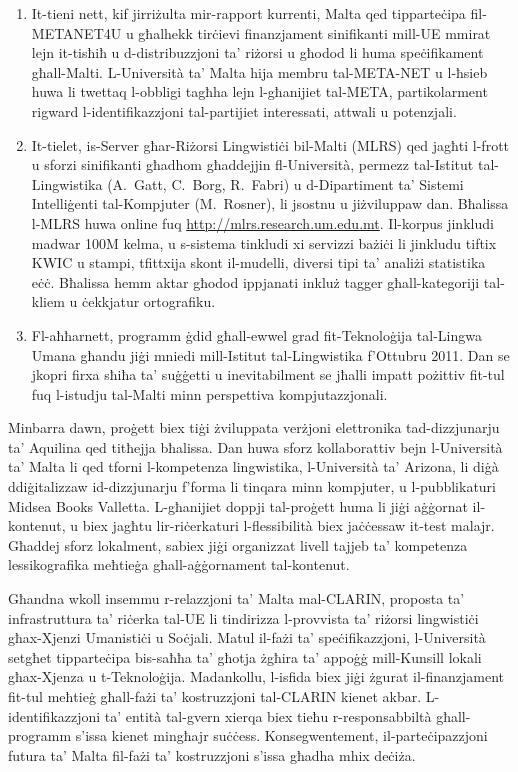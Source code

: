 \begin{multicols}{2}
\begin{enumerate}
\item It-tieni nett, kif jirriżulta mir-rapport kurrenti, Malta qed tipparteċipa fil-METANET4U u għalhekk tirċievi finanzjament sinifikanti mill-UE mmirat lejn it-tisħiħ u d-distribuzzjoni ta’ riżorsi u għodod li huma speċifikament għall-Malti. L-Università ta’ Malta hija membru tal-META-NET u l-ħsieb huwa li twettaq l-obbligi tagħha lejn l-għanijiet tal-META, partikolarment rigward l-identifikazzjoni tal-partijiet interessati, attwali u potenzjali. 

\item It-tielet, is-Server għar-Riżorsi Lingwistiċi bil-Malti (MLRS) \cite{Rosner-et-al:2006, MLRS1} qed jagħti l-frott u sforzi sinifikanti għadhom għaddejjin fl-Università, permezz tal-Istitut tal-Lingwistika (A.~Gatt, C.~Borg, R.~Fabri) u d-Dipartiment ta’ Sistemi Intelliġenti tal-Kompjuter (M.~Rosner), li jsostnu u jiżviluppaw dan. Bħalissa l-MLRS huwa online fuq \url{http://mlrs.research.um.edu.mt}. Il-korpus jinkludi madwar 100M kelma, u s-sistema tinkludi xi servizzi bażiċi li jinkludu tiftix KWIC u stampi, tfittxija skont il-mudelli, diversi tipi ta’ analiżi statistika eċċ. Bħalissa hemm aktar għodod ippjanati inkluż tagger għall-kategoriji tal-kliem u ċekkjatur ortografiku.

\item Fl-aħħarnett, programm ġdid għall-ewwel grad fit-Teknoloġija tal-Lingwa Umana għandu jiġi mniedi mill-Istitut tal-Lingwistika f’Ottubru 2011. Dan se jkopri firxa sħiħa ta’ suġġetti u inevitabilment se jħalli impatt pożittiv fit-tul fuq l-istudju tal-Malti minn perspettiva kompjutazzjonali.
\end{enumerate}

Minbarra dawn, proġett biex tiġi żviluppata verżjoni elettronika tad-dizzjunarju ta’ Aquilina \cite{Aquilina:1987,Aquilina:1990} qed titħejja bħalissa. Dan huwa sforz kollaborattiv bejn l-Università ta’ Malta li qed tforni l-kompetenza lingwistika, l-Università ta’ Arizona, li diġà ddiġitalizzaw id-dizzjunarju f’forma li tinqara minn kompjuter, u l-pubblikaturi Midsea Books Valletta. L-għanijiet doppji tal-proġett huma li jiġi aġġornat il-kontenut, u biex jagħtu lir-riċerkaturi l-flessibilità biex jaċċessaw it-test malajr. Għaddej sforz lokalment, sabiex jiġi organizzat livell tajjeb ta’ kompetenza lessikografika meħtieġa għall-aġġornament tal-kontenut.

Għandna wkoll insemmu r-relazzjoni ta’ Malta mal-CLARIN,  proposta ta’ infrastruttura ta’ riċerka tal-UE li tindirizza l-provvista ta’ riżorsi lingwistiċi għax-Xjenzi Umanistiċi u Soċjali. Matul il-fażi ta’ speċifikazzjoni, l-Università setgħet tipparteċipa bis-saħħa ta’ għotja żgħira ta’ appoġġ mill-Kunsill lokali għax-Xjenza u t-Teknoloġija. Madankollu, l-isfida biex jiġi żgurat il-finanzjament fit-tul meħtieġ għall-fażi ta’ kostruzzjoni tal-CLARIN kienet akbar. L-identifikazzjoni ta’ entità tal-gvern xierqa biex tieħu r-responsabbiltà għall-programm s’issa kienet mingħajr suċċess. Konsegwentement, il-parteċipazzjoni futura ta’ Malta fil-fażi ta’ kostruzzjoni s’issa għadha mhix deċiża.


\end{multicols}
